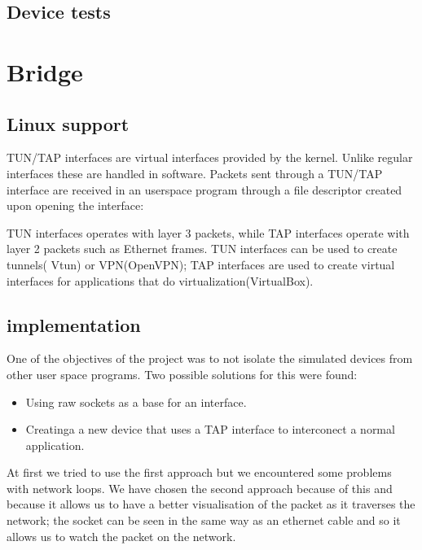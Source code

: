 \subsection{Device tests}
\label{sub-sec:firewall-tests}

\section{Bridge}

\subsection{Linux support}
\label{sub-sec:bridge-lin}

TUN/TAP interfaces are virtual interfaces provided by the kernel. Unlike regular interfaces
these are handled in software. Packets sent through a TUN/TAP interface are received in
an userspace program through a file descriptor created upon opening the interface: 

\lstset{language=C,caption=Opening a tun/tap interface,label=lst:tapopen}


TUN interfaces operates with layer 3 packets, while TAP interfaces operate with layer 
2 packets such as Ethernet frames. TUN interfaces can be used to create tunnels( Vtun)
or VPN(OpenVPN); TAP interfaces are used to create virtual interfaces for applications 
that do virtualization(VirtualBox).

\subsection{\text{\project} implementation}
\label{sub-sec:bridge-lkl}

One of the objectives of the project was to not isolate the simulated devices from other user space 
programs. Two possible solutions for this were found:
\begin{itemize}
  \item Using raw sockets as a base for an interface.
  \item Creatinga a new device that uses a TAP interface to interconect a normal application.
\end{itemize}

At first we tried to use the first approach but we encountered some problems with network loops.
We have chosen the second approach because of this and because it allows us to have a better visualisation of the packet
as it traverses the network; the socket can be seen in the same way as an ethernet cable and so it allows
us to watch the packet on the network.

